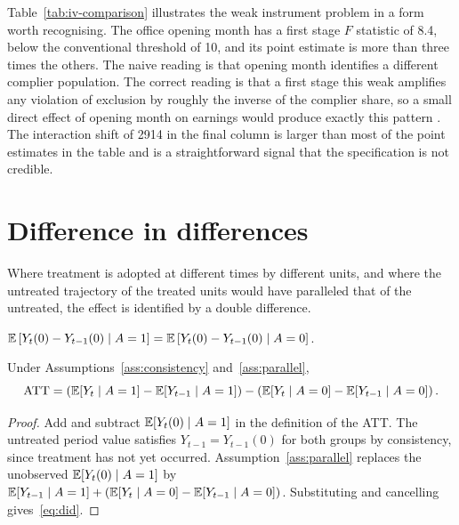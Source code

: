 Table~\ref{tab:iv-comparison} illustrates the weak instrument problem in a form
worth recognising. The office opening month has a first stage $F$ statistic of
8.4, below the conventional threshold of 10, and its point estimate is more than
three times the others. The naive reading is that opening month identifies a
different complier population. The correct reading is that a first stage this
weak amplifies any violation of exclusion by roughly the inverse of the complier
share, so a small direct effect of opening month on earnings would produce
exactly this pattern \citep{nakamura2015weakiv}. The interaction shift of 2914 in the final column is
larger than most of the point estimates in the table and is a straightforward
signal that the specification is not credible.

\section{Difference in differences}
\label{sec:design-did}

Where treatment is adopted at different times by different units, and where the
untreated trajectory of the treated units would have paralleled that of the
untreated, the effect is identified by a double difference.

\begin{assumption}
\label{ass:parallel}
$\mathbb{E}\left[ Y_{t}(0) - Y_{t-1}(0) \mid A = 1 \right]
 = \mathbb{E}\left[ Y_{t}(0) - Y_{t-1}(0) \mid A = 0 \right]$.
\end{assumption}

\begin{proposition}
\label{prop:did}
Under Assumptions~\ref{ass:consistency} and~\ref{ass:parallel},
\begin{equation}
  \mathrm{ATT} = \left( \mathbb{E}[Y_t \mid A=1] - \mathbb{E}[Y_{t-1} \mid A=1] \right)
       - \left( \mathbb{E}[Y_t \mid A=0] - \mathbb{E}[Y_{t-1} \mid A=0] \right).
  \label{eq:did}
\end{equation}
\end{proposition}

\begin{proof}
Add and subtract $\mathbb{E}[Y_t(0) \mid A=1]$ in the definition of the ATT. The
untreated period value satisfies $Y_{t-1} = Y_{t-1}(0)$ for both groups by
consistency, since treatment has not yet occurred. Assumption~\ref{ass:parallel}
replaces the unobserved $\mathbb{E}[Y_t(0) \mid A=1]$ by
$\mathbb{E}[Y_{t-1} \mid A=1] + \left( \mathbb{E}[Y_t \mid A=0] - \mathbb{E}[Y_{t-1} \mid A=0] \right)$.
Substituting and cancelling gives~\eqref{eq:did}.
\end{proof}

